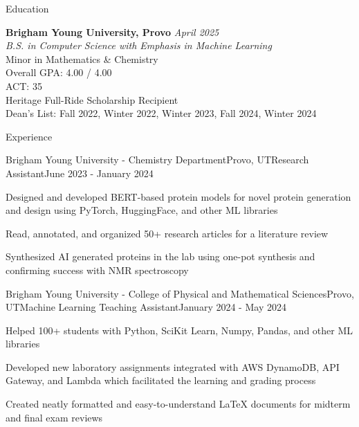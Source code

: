 \documentclass[
	10pt,
]{resume}
\begin{document}
\begin{rSection}{Education}
	
	\textbf{Brigham Young University, Provo} \hfill \textit{April 2025} \\ 
	\textit{B.S. in Computer Science with Emphasis in Machine Learning} \\
	Minor in Mathematics \& Chemistry \smallskip \\
	Overall GPA: 4.00 / 4.00 \\
	ACT: 35 \\
	Heritage Full-Ride Scholarship Recipient \\
	Dean's List: Fall 2022, Winter 2022, Winter 2023, Fall 2024, Winter 2024
\end{rSection}

\begin{rSection}{Experience}

	\begin{rSubsection}{Brigham Young University - Chemistry Department}{Provo, UT}{Research Assistant}{June 2023 - January 2024}
		\item Designed and developed BERT-based protein models for novel protein generation and design using PyTorch,
		HuggingFace, and other ML libraries
		\item Read, annotated, and organized 50+ research articles for a literature review
		\item Synthesized AI generated proteins in the lab using one-pot synthesis and confirming success with NMR
		spectroscopy
	\end{rSubsection}


	\begin{rSubsection}{Brigham Young University - College of Physical and Mathematical Sciences}{Provo, UT}{Machine Learning Teaching Assistant}{January 2024 - May 2024}
		\item Helped 100+ students with Python, SciKit Learn, Numpy, Pandas, and other ML libraries
    \item Developed new laboratory assignments integrated with AWS DynamoDB, API Gateway, and Lambda which facilitated the learning and grading process
    \item Created neatly formatted and easy-to-understand LaTeX documents for midterm and final exam reviews
	\end{rSubsection}



\end{rSection}
\end{document}
